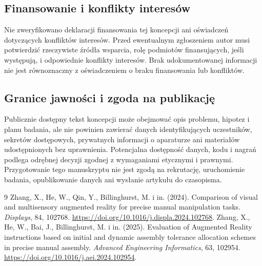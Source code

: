 \documentclass[11pt,a4paper]{article}
\begin{document}
\subsection*{Finansowanie i konflikty interesów}
Nie zweryfikowano deklaracji finansowania tej koncepcji ani oświadczeń dotyczących konfliktów interesów. Przed ewentualnym zgłoszeniem autor musi potwierdzić rzeczywiste źródła wsparcia, rolę podmiotów finansujących, jeśli występują, i odpowiednie konflikty interesów. Brak udokumentowanej informacji nie jest równoznaczny z oświadczeniem o braku finansowania lub konfliktów.

\subsection*{Granice jawności i zgoda na publikację}
Publicznie dostępny tekst koncepcji może obejmować opis problemu, hipotez i planu badania, ale nie powinien zawierać danych identyfikujących uczestników, sekretów dostępowych, prywatnych informacji o aparaturze ani materiałów udostępnionych bez uprawnienia. Potencjalna dostępność danych, kodu i nagrań podlega odrębnej decyzji zgodnej z wymaganiami etycznymi i prawnymi. Przygotowanie tego manuskryptu nie jest zgodą na rekrutację, uruchomienie badania, opublikowanie danych ani wysłanie artykułu do czasopisma.


\begin{thebibliography}{9}
 Zhang, X., He, W., Qin, Y., Billinghurst, M. i in. (2024). Comparison of visual and multisensory augmented reality for precise manual manipulation tasks. \textit{Displays}, 84, 102768. \url{https://doi.org/10.1016/j.displa.2024.102768}.
 Zhang, X., He, W., Bai, J., Billinghurst, M. i in. (2025). Evaluation of Augmented Reality instructions based on initial and dynamic assembly tolerance allocation schemes in precise manual assembly. \textit{Advanced Engineering Informatics}, 63, 102954. \url{https://doi.org/10.1016/j.aei.2024.102954}.
\end{thebibliography}
\end{document}
